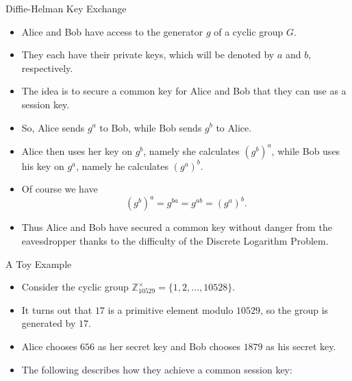 \documentclass[ %
 10pt, xcolor={dvipsnames,svgnames,x11names,hyperref},
   hyperref={colorlinks=true,citecolor=green,linkcolor=DarkRed,urlcolor=ProcessBlue,anchorcolor=blue}
  ]{beamer}
\newenvironment{stepitemize}{\begin{itemize}[<+->]}{\end{itemize} }
\newcommand{\Z}{\mathbb{Z}}
\begin{document}
\begin{frame}{Diffie-Helman Key Exchange}
\begin{stepitemize}
\item Alice and Bob have access to the generator $g$ of a cyclic group $G$.
\item They each have their private keys, which will be denoted by $a$ and $b$, respectively.
\item The idea is to secure a common key for Alice and Bob that they can use as a session key.
\item So, Alice sends $g^a$ to Bob, while Bob sends $g^b$ to Alice.
\item Alice then uses her key on $g^b$, namely she calculates
$(g^b)^a$, while Bob uses his key on $g^a$, namely he calculates $(g^a)^b$.
\item Of course we have
$$(g^b)^a=g^{ba} = g^{ab}=(g^a)^b.$$

\item Thus Alice and Bob have secured a common key without danger from the eavesdropper thanks to the difficulty of the Discrete Logarithm Problem.
\end{stepitemize}
\end{frame}

\begin{frame}{A Toy Example}
\begin{stepitemize}
\item Consider the cyclic group
$\Z_{10529}^{\times} = \{1, 2, \dots, 10528\}. $
\item It turns out that $17$ is a primitive element modulo $10529$, so the group is generated by $17$.
 \item Alice chooses $656$ as her secret key and Bob chooses $1879$ as his secret key.
 \item The following describes how they achieve a common session key:

\end{stepitemize}

\end{frame}
\end{document}
